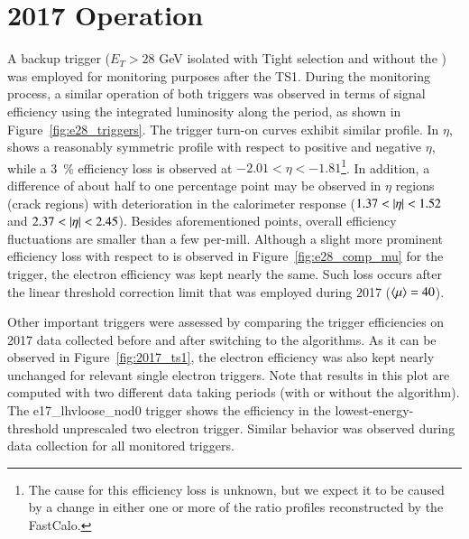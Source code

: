 \section{2017 Operation}\label{ssec:2017_ringer_operation}


A backup trigger ($E_T > 28$ GeV isolated with Tight selection and without the \rnn{}) was employed for
monitoring purposes after the TS1. During the monitoring process, a similar
operation of both triggers was observed in terms of signal efficiency using the
integrated luminosity along the period, as shown in
Figure~\ref{fig:e28_triggers}. The trigger
turn-on curves exhibit similar profile. In $\eta$, \rnn{} shows a reasonably symmetric
profile with respect to positive and negative $\eta$, while a
\SI{3}{\%} efficiency loss is observed at $-2.01<\eta<-1.81$\footnote{The cause for this efficiency loss is unknown, but we expect it to be caused by a change in either one or more of the ratio profiles reconstructed by the FastCalo.}. In addition, a difference of about
half to one percentage point may be observed in $\eta$ regions (crack regions) with deterioration in the calorimeter
response ($1.37 < \abseta < 1.52$ and $2.37 < \abseta < 2.45$). Besides
aforementioned points, overall efficiency fluctuations are smaller than a few
per-mill. Although a slight more prominent efficiency loss with respect to
\avgmu{} is observed in Figure~\ref{fig:e28_comp_mu} for the \rnn{} trigger, the
electron efficiency was kept nearly the same. Such loss occurs after the
linear threshold correction limit that was employed during 2017 ($\langle \mu \rangle=40$).

Other important triggers were assessed by comparing the trigger efficiencies on
2017 data collected before and after switching to the \rnn{} algorithms.  As it can be
observed in Figure~\ref{fig:2017_ts1}, the electron efficiency was also kept
nearly unchanged for relevant single electron triggers. Note that results in
this plot are computed with two different data taking periods (with or
without the \rnn{} algorithm). The e17\_lhvloose\_nod0 trigger shows the
efficiency in the lowest-energy-threshold 
unprescaled two electron trigger.
Similar behavior was observed during data collection for all monitored triggers.


